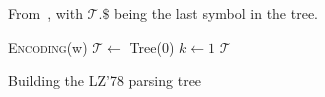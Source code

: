 From~\cite{jacquet_analytic_2015}, with $\mathcal{T}.\$$ being 
the last symbol in the tree.

\label{app:lempelziv}

\begin{algorithm}[H]
 \KwProcedure \textsc{Encoding}(w)\;
 $\mathcal{T} \leftarrow$ Tree(0)\;
 $k \leftarrow 1$\;
 \KwReturn $\mathcal{T}$
 \caption{Building the LZ'78 parsing tree}
\end{algorithm}
